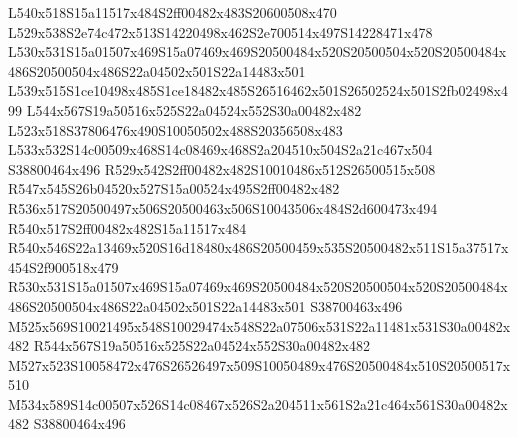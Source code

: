 \documentclass{article}
\begin{document}
\begin{multicols}{2}







L540x518S15a11517x484S2ff00482x483S20600508x470 L529x538S2e74c472x513S14220498x462S2e700514x497S14228471x478 L530x531S15a01507x469S15a07469x469S20500484x520S20500504x520S20500484x486S20500504x486S22a04502x501S22a14483x501 L539x515S1ce10498x485S1ce18482x485S26516462x501S26502524x501S2fb02498x499 L544x567S19a50516x525S22a04524x552S30a00482x482 L523x518S37806476x490S10050502x488S20356508x483 L533x532S14c00509x468S14c08469x468S2a204510x504S2a21c467x504 S38800464x496 R529x542S2ff00482x482S10010486x512S26500515x508 R547x545S26b04520x527S15a00524x495S2ff00482x482 R536x517S20500497x506S20500463x506S10043506x484S2d600473x494 R540x517S2ff00482x482S15a11517x484 R540x546S22a13469x520S16d18480x486S20500459x535S20500482x511S15a37517x454S2f900518x479 R530x531S15a01507x469S15a07469x469S20500484x520S20500504x520S20500484x486S20500504x486S22a04502x501S22a14483x501 S38700463x496 M525x569S10021495x548S10029474x548S22a07506x531S22a11481x531S30a00482x482 R544x567S19a50516x525S22a04524x552S30a00482x482 M527x523S10058472x476S26526497x509S10050489x476S20500484x510S20500517x510 M534x589S14c00507x526S14c08467x526S2a204511x561S2a21c464x561S30a00482x482 S38800464x496


\end{multicols}
\end{document}
